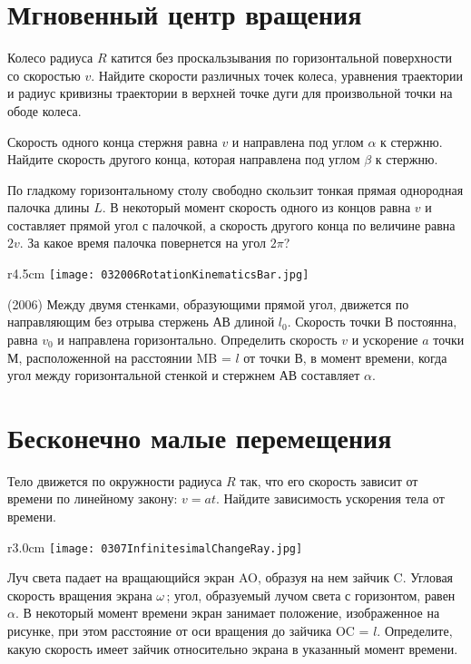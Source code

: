 \section{Мгновенный центр вращения}

\AddProb Колесо радиуса $R$ катится без проскальзывания по горизонтальной поверхности со скоростью $v$. 
Найдите скорости различных точек колеса, уравнения траектории и радиус кривизны траектории в верхней точке дуги для произвольной точки на ободе колеса.

\AddProb Скорость одного конца стержня равна $v$ и направлена под углом $\alpha$ к стержню. 
Найдите скорость другого конца, которая направлена под углом $\beta$ к стержню.

\AddProb По гладкому горизонтальному столу свободно скользит тонкая прямая однородная палочка длины $L$. 
В некоторый момент скорость одного из концов равна $v$ и составляет прямой угол с палочкой, 
а скорость другого конца по величине равна $2v$. За какое время палочка повернется на угол $2\pi$?

\begin{wrapfigure}{r}{4.5cm}
\texttt{[image: 032006RotationKinematicsBar.jpg]}
\end{wrapfigure}

\AddProb (2006) Между двумя стенками, образующими прямой угол, движется по направляющим без отрыва стержень АВ длиной $l_0$. 
Скорость точки В постоянна, равна $v_0$ и направлена горизонтально. Определить скорость $v$ и ускорение $a$  точки М, 
расположенной на расстоянии MB = $l$ от точки В, в момент времени, когда угол между горизонтальной стенкой и стержнем АВ составляет $\alpha$.


\section{Бесконечно малые перемещения}

\AddProb Тело движется по окружности радиуса $R$ так, что его скорость зависит от времени по линейному закону: $v = at$. 
Найдите зависимость ускорения тела от времени.

\begin{wrapfigure}{r}{3.0cm}
\texttt{[image: 0307InfinitesimalChangeRay.jpg]}
\end{wrapfigure}

\AddProb Луч света падает на вращающийся экран AO, образуя на нем зайчик C. Угловая скорость вращения экрана $\omega$\,; 
угол, образуемый лучом света с горизонтом, равен $\alpha$. В некоторый момент времени экран занимает положение, 
изображенное на рисунке, при этом расстояние от оси вращения до зайчика OC = $l$. 
Определите, какую скорость имеет зайчик относительно экрана в указанный момент времени.

